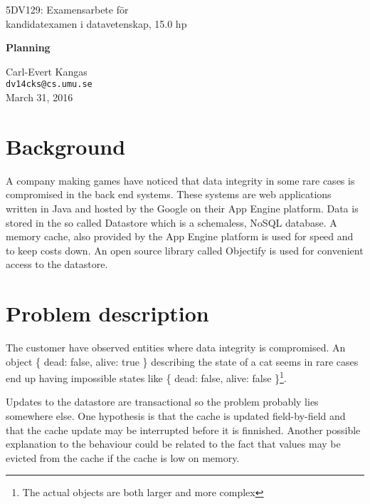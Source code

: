 \documentclass[10pt, titlepage, oneside, a4paper]{article}
\begin{document}
\begin{center}
\begin{large}
  5DV129: Examensarbete för\\ kandidatexamen i datavetenskap, 15.0 hp
  
\vspace{8mm}
\begin{LARGE}\textbf{Planning}\end{LARGE}
\vspace{6mm}

\end{large}

Carl-Evert Kangas\\\texttt{dv14cks@cs.umu.se}\\March 31, 2016
\vspace{3mm}

\end{center} 

\section*{Background}
 
A company making games have noticed that data integrity in some rare
cases is compromised in the back end systems. These systems are web
applications written in Java and hosted by the Google on their App Engine
platform. Data is stored in the so called Datastore which is a
schemaless, NoSQL database. A memory cache, also provided by the App
Engine platform is used for speed and to keep costs down. An open
source library called Objectify is used for convenient access to the datastore.

\section*{Problem description}

The customer have observed entities where data integrity is
compromised. An object \{ dead: false, alive: true \} describing the
state of a cat seems in rare cases end up having impossible states
like \{ dead: false, alive: false \}\footnote{The actual objects are
  both larger and more complex}.

Updates to the datastore are transactional so the problem probably
lies somewhere else. One hypothesis is that the cache is updated
field-by-field and that the cache update may be interrupted before it
is finnished. Another possible explanation to the behaviour could be
related to the fact that values may be evicted from the cache if the
cache is low on memory.
\end{document}
